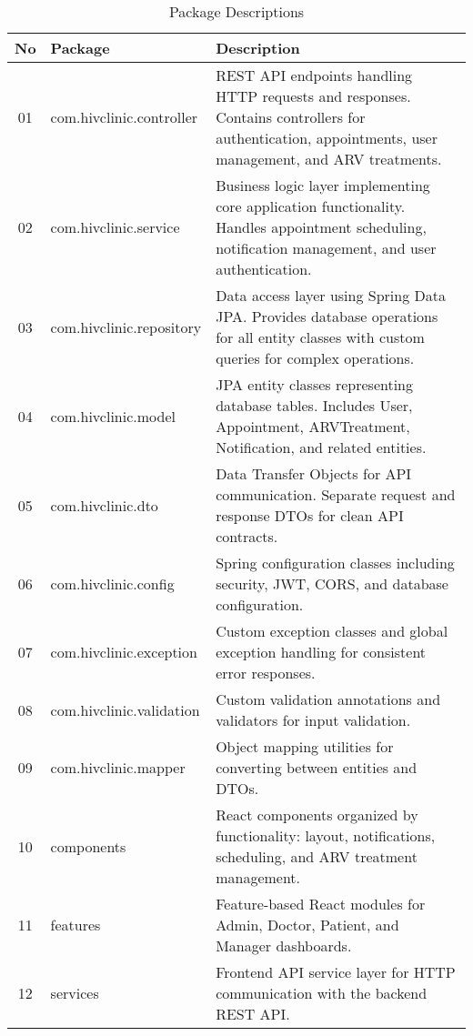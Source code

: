 \documentclass[12pt,a4paper]{article}
\begin{document}
\begin{table}[H]
\centering
\caption{Package Descriptions}
\label{tab:package-descriptions}
\begin{tabularx}{\textwidth}{|c|l|X|}
\hline
\textbf{No} & \textbf{Package} & \textbf{Description} \\
\hline
01 & com.hivclinic.controller & REST API endpoints handling HTTP requests and responses. Contains controllers for authentication, appointments, user management, and ARV treatments. \\
\hline
02 & com.hivclinic.service & Business logic layer implementing core application functionality. Handles appointment scheduling, notification management, and user authentication. \\
\hline
03 & com.hivclinic.repository & Data access layer using Spring Data JPA. Provides database operations for all entity classes with custom queries for complex operations. \\
\hline
04 & com.hivclinic.model & JPA entity classes representing database tables. Includes User, Appointment, ARVTreatment, Notification, and related entities. \\
\hline
05 & com.hivclinic.dto & Data Transfer Objects for API communication. Separate request and response DTOs for clean API contracts. \\
\hline
06 & com.hivclinic.config & Spring configuration classes including security, JWT, CORS, and database configuration. \\
\hline
07 & com.hivclinic.exception & Custom exception classes and global exception handling for consistent error responses. \\
\hline
08 & com.hivclinic.validation & Custom validation annotations and validators for input validation. \\
\hline
09 & com.hivclinic.mapper & Object mapping utilities for converting between entities and DTOs. \\
\hline
10 & components & React components organized by functionality: layout, notifications, scheduling, and ARV treatment management. \\
\hline
11 & features & Feature-based React modules for Admin, Doctor, Patient, and Manager dashboards. \\
\hline
12 & services & Frontend API service layer for HTTP communication with the backend REST API. \\
\hline
\end{tabularx}
\end{table}
\end{document}
